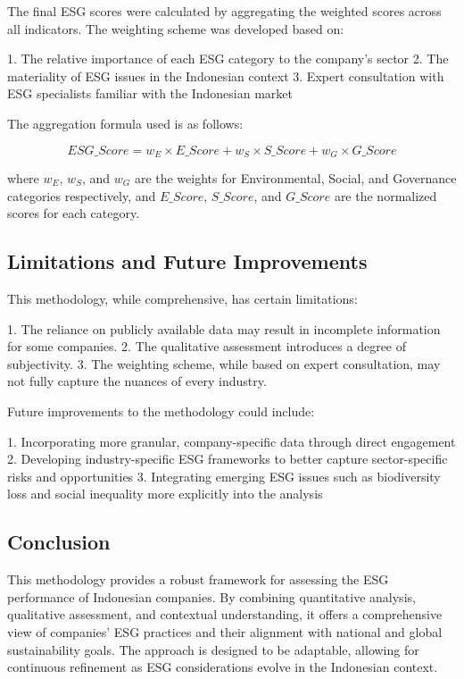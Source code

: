 The final ESG scores were calculated by aggregating the weighted scores across all indicators. The weighting scheme was developed based on:

1. The relative importance of each ESG category to the company's sector
2. The materiality of ESG issues in the Indonesian context
3. Expert consultation with ESG specialists familiar with the Indonesian market

The aggregation formula used is as follows:

\begin{equation}
ESG\_Score = w_E \times E\_Score + w_S \times S\_Score + w_G \times G\_Score
\end{equation}

where $w_E$, $w_S$, and $w_G$ are the weights for Environmental, Social, and Governance categories respectively, and $E\_Score$, $S\_Score$, and $G\_Score$ are the normalized scores for each category.

\subsection{Limitations and Future Improvements}

This methodology, while comprehensive, has certain limitations:

1. The reliance on publicly available data may result in incomplete information for some companies.
2. The qualitative assessment introduces a degree of subjectivity.
3. The weighting scheme, while based on expert consultation, may not fully capture the nuances of every industry.

Future improvements to the methodology could include:

1. Incorporating more granular, company-specific data through direct engagement
2. Developing industry-specific ESG frameworks to better capture sector-specific risks and opportunities
3. Integrating emerging ESG issues such as biodiversity loss and social inequality more explicitly into the analysis

\subsection{Conclusion}

This methodology provides a robust framework for assessing the ESG performance of Indonesian companies. By combining quantitative analysis, qualitative assessment, and contextual understanding, it offers a comprehensive view of companies' ESG practices and their alignment with national and global sustainability goals. The approach is designed to be adaptable, allowing for continuous refinement as ESG considerations evolve in the Indonesian context.